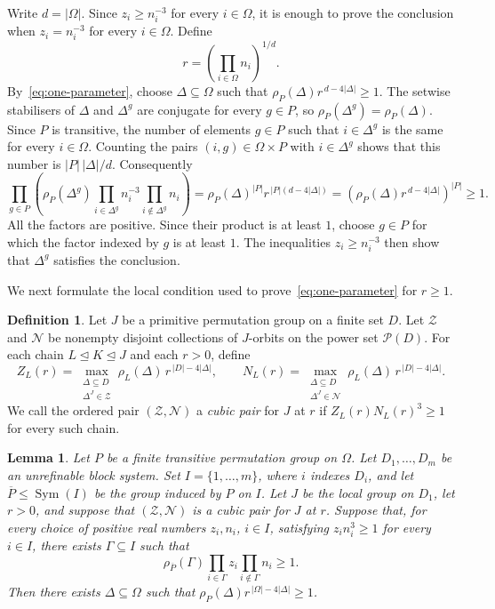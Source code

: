 \documentclass[10pt]{amsart}
\newtheorem{lemma}[theorem]{Lemma}
\theoremstyle{definition}
\newtheorem{definition}[theorem]{Definition}
\renewcommand{\ge}{\geqslant}
\renewcommand{\leq}{\leqslant}
\renewcommand{\geq}{\geqslant}
\let\oldendproof\endproof
\renewenvironment{proof}[1][\proofname]{%
  \oldproof[\bfseries #1]%
}{\oldendproof}
\newcommand{\pow}{\mathcal{P}}
\DeclareMathOperator{\Sym}{Sym}
\numberwithin{equation}{section}
\numberwithin{table}{section}
\begin{document}
\begin{proof}
Write $d=|\Omega|$. Since $z_i\ge n_i^{-3}$ for every $i\in\Omega$, it
is enough to prove the conclusion when $z_i=n_i^{-3}$ for every $i\in\Omega$.
Define
$$
  r=\left(\prod_{i\in\Omega}n_i\right)^{1/d}.
$$
By~\eqref{eq:one-parameter}, choose $\Delta\subseteq\Omega$ such that
$\rho_P(\Delta)r^{\,d-4|\Delta|}\ge1$.
The setwise stabilisers of $\Delta$ and $\Delta^g$ are conjugate for every
$g\in P$, so $\rho_P(\Delta^g)=\rho_P(\Delta)$. Since $P$ is transitive, the
number of elements $g\in P$ such that $i\in\Delta^g$ is the same for every
$i\in\Omega$. Counting the pairs $(i,g)\in\Omega\times P$ with
$i\in\Delta^g$ shows that this number is $|P|\,|\Delta|/d$.
Consequently
$$
\prod_{g\in P}\left(\rho_P(\Delta^g)\prod_{i\in\Delta^g}n_i^{-3}
\prod_{i\notin\Delta^g}n_i\right)
=\rho_P(\Delta)^{|P|}r^{\,|P|(d-4|\Delta|)}
=\left(\rho_P(\Delta)r^{\,d-4|\Delta|}\right)^{|P|}\ge1.
$$
All the factors are positive. Since their product is at least $1$, choose
$g\in P$ for which the factor indexed by $g$ is at least $1$. The inequalities
$z_i\ge n_i^{-3}$ then show that $\Delta^g$ satisfies the conclusion.
\end{proof}

We next formulate the local condition used to prove~\eqref{eq:one-parameter}
for $r\ge1$.

\begin{definition}\label{def:cubic-pair}
Let $J$ be a primitive permutation group on a finite set $D$. Let
$\mathcal Z$ and $\mathcal N$ be nonempty disjoint collections of $J$-orbits
on the power set $\pow(D)$. For each chain
$L\trianglelefteq K\trianglelefteq J$ and each $r>0$, define
$$
  Z_L(r)=\max_{\substack{\Delta\subseteq D\\ \Delta^J\in\mathcal Z}}
  \rho_L(\Delta)\,r^{\,|D|-4|\Delta|},
  \qquad
  N_L(r)=\max_{\substack{\Delta\subseteq D\\ \Delta^J\in\mathcal N}}
  \rho_L(\Delta)\,r^{\,|D|-4|\Delta|}.
$$
We call the ordered pair $(\mathcal Z,\mathcal N)$ a {\it cubic pair} for $J$
at $r$ if
$Z_L(r)N_L(r)^{3}\ge1$ for every such chain.
\end{definition}

\begin{lemma}\label{lem:cubic-pair-transfer}
Let $P$ be a finite transitive permutation group on $\Omega$. Let
$D_1,\ldots,D_m$ be an unrefinable block system. Set
$I=\{1,\ldots,m\}$, where $i$ indexes $D_i$, and let
$\overline P\leq\Sym(I)$ be the group induced by $P$ on $I$. Let $J$ be the
local group on $D_1$, let $r>0$, and suppose that
$(\mathcal Z,\mathcal N)$ is a cubic pair for $J$ at $r$.
Suppose that, for every choice of positive real numbers $z_i,n_i$, $i\in I$,
satisfying $z_i n_i^3\geq1$ for every $i\in I$, there exists
$\Gamma\subseteq I$ such that
\begin{equation}\label{eq:cubic-transfer-top}
  \rho_{\overline P}(\Gamma)
  \prod_{i\in\Gamma}z_i
  \prod_{i\notin\Gamma}n_i\geq1.
\end{equation}
Then there exists $\Delta\subseteq\Omega$ such that $\rho_P(\Delta)r^{\,|\Omega|-4|\Delta|}\ge1$.
\end{lemma}
\end{document}
